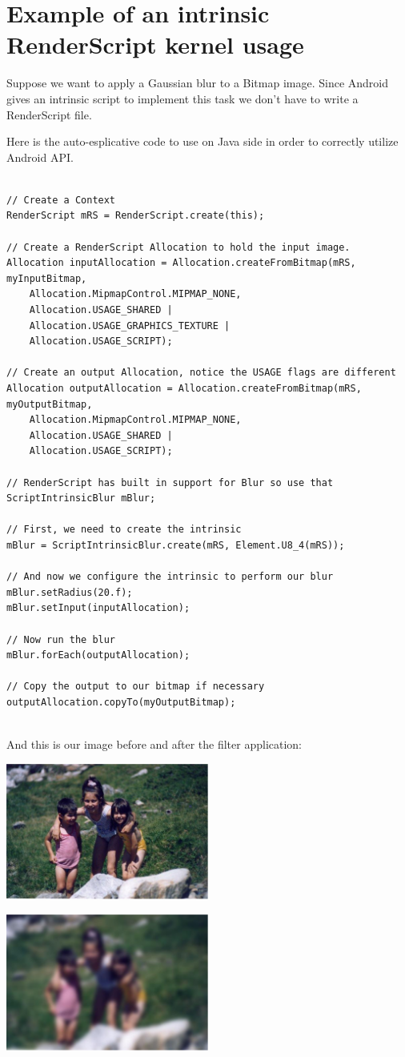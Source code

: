 \section{Example of an intrinsic RenderScript kernel usage}
\label{app:ex1}
\noindent Suppose we want to apply a Gaussian blur to a Bitmap image. Since Android gives an intrinsic script to implement this task we don't have to write a RenderScript file.

Here is the auto-esplicative code to use on Java side in order to correctly utilize Android API.

\begin{lstlisting}[frame=single]

// Create a Context
RenderScript mRS = RenderScript.create(this);

// Create a RenderScript Allocation to hold the input image.
Allocation inputAllocation = Allocation.createFromBitmap(mRS, myInputBitmap,
	Allocation.MipmapControl.MIPMAP_NONE,
	Allocation.USAGE_SHARED |
	Allocation.USAGE_GRAPHICS_TEXTURE |
	Allocation.USAGE_SCRIPT);

// Create an output Allocation, notice the USAGE flags are different
Allocation outputAllocation = Allocation.createFromBitmap(mRS, myOutputBitmap,
	Allocation.MipmapControl.MIPMAP_NONE,
	Allocation.USAGE_SHARED |
	Allocation.USAGE_SCRIPT);

// RenderScript has built in support for Blur so use that
ScriptIntrinsicBlur mBlur;

// First, we need to create the intrinsic
mBlur = ScriptIntrinsicBlur.create(mRS, Element.U8_4(mRS));

// And now we configure the intrinsic to perform our blur
mBlur.setRadius(20.f);
mBlur.setInput(inputAllocation);

// Now run the blur
mBlur.forEach(outputAllocation);

// Copy the output to our bitmap if necessary
outputAllocation.copyTo(myOutputBitmap);


\end{lstlisting}
\vspace{4ex}
And this is our image before and after the filter application:

\begin{figurehere}
 \centering
 \includegraphics[width=0.5\textwidth]{./pictures/childhood}
 \label{fig:childhood}
\end{figurehere}
\begin{figurehere}
 \centering
 \includegraphics[width=0.5\textwidth]{./pictures/childhoodblur}
 \label{fig:childhoodblur}
\end{figurehere}

